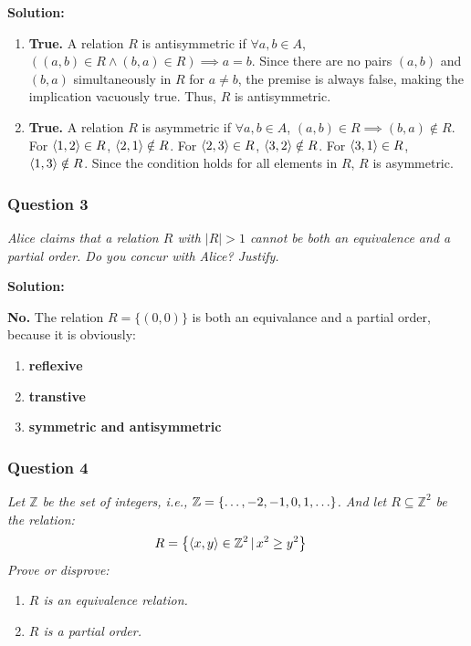 \documentclass[
	letterpaper, %
	11pt, %
]{CSUniSchoolLabReport}
\newcommand{\tuple}[1]{\ensuremath{\left\langle #1 \right\rangle}\xspace}
\newcommand{\set}[1]{\ensuremath{\left\{#1\right\}}\xspace}
\let\originalleft\left
\let\originalright\right
\renewcommand{\left}{\mathopen{}\mathclose\bgroup\originalleft}
\renewcommand{\right}{\aftergroup\egroup\originalright}
\begin{document}
\textbf{Solution:}
\begin{enumerate}
    \item \textbf{True.} A relation $R$ is antisymmetric if $\forall a,b \in A$, $((a,b) \in R \land (b,a) \in R) \implies a = b$.
    Since there are no pairs $(a,b)$ and $(b,a)$ simultaneously in $R$ for $a \neq b$, the premise is always false, making the implication vacuously true. Thus, $R$ is antisymmetric.

    \item \textbf{True.} A relation $R$ is asymmetric if $\forall a,b \in A$, $(a,b) \in R \implies (b,a) \notin R$.
    For $\tuple{1,2} \in R$, $\tuple{2,1} \notin R$.
    For $\tuple{2,3} \in R$, $\tuple{3,2} \notin R$.
    For $\tuple{3,1} \in R$, $\tuple{1,3} \notin R$.
    Since the condition holds for all elements in $R$, $R$ is asymmetric.
\end{enumerate}

\subsubsection*{Question 3}
\textit{Alice claims that a relation $R$ with $|R| > 1$ cannot be both an equivalence and a partial order. Do you concur with Alice? Justify.}

\textbf{Solution:} 

\textbf{No.} The relation $R = \{(0,0)\}$ is both an equivalance and a partial order, because it is obviously:
\begin{enumerate}
    \item \textbf{reflexive}
    \item \textbf{transtive}
    \item \textbf{symmetric and antisymmetric}
\end{enumerate}

\pagebreak

\subsubsection*{Question 4}
\textit{Let $\mathbb{Z}$ be the set of integers, i.e., $\mathbb{Z} = \set{\ldots,-2,-1,0,1,\ldots}$. And let $R\subseteq \mathbb{Z}^2$ be the relation:
\begin{align*}
R &=\set{\tuple{x,y}\in\mathbb{Z}^2\,|\, x^2 \ge y^2}
\end{align*}
Prove or disprove:}
\begin{enumerate}
\item \textit{$R$ is an equivalence relation.}
\item \textit{$R$ is a partial order.}
\end{enumerate}
\end{document}

